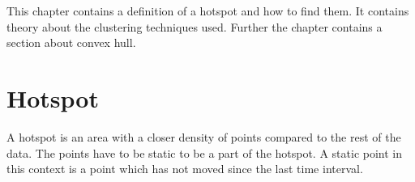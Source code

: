 This chapter contains a definition of a hotspot and how to find them.
It contains theory about the clustering techniques used.
Further the chapter contains a section about convex hull.

\section{Hotspot}\label{hotspot}
A hotspot is an area with a closer density of points compared to the rest of the data.
The points have to be static to be a part of the hotspot.
A static point in this context is a point which has not moved since the last time interval.